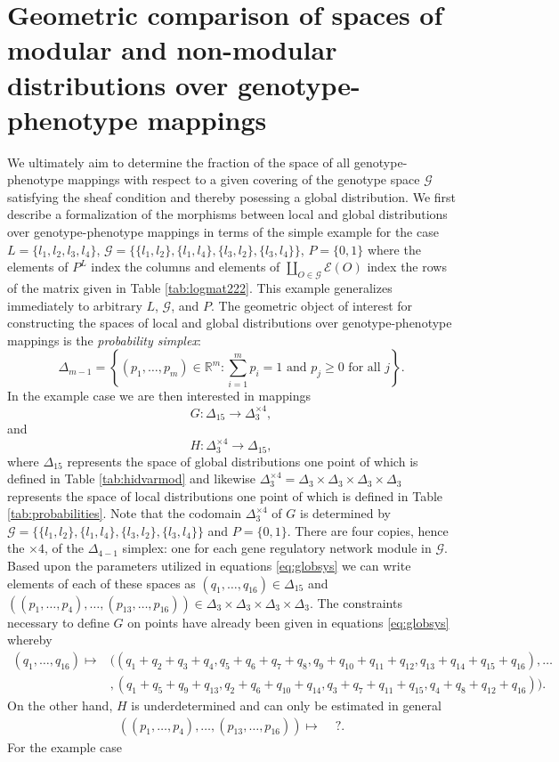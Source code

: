 \section*{Geometric comparison of spaces of modular and non-modular distributions over genotype-phenotype mappings}
We ultimately aim to determine the fraction of the space of all genotype-phenotype mappings with respect to a given covering of the genotype space $\mathcal{G}$ satisfying the sheaf condition and thereby posessing a global distribution. We first describe a formalization of the morphisms between local and global distributions over genotype-phenotype mappings in terms of the simple example for the case $L = \{ l_1,l_2,l_3,l_4 \}$, $\mathcal{G} = \{\{l_1,l_2 \},\{l_1,l_4 \},\{l_3,l_2\},\{l_3,l_4\} \}$, $P=\{0,1\}$ where the elements of $P^L$ index the columns and elements of $\coprod_{O \in \mathcal{G}} \mathcal{E} (O)$ index the rows of the matrix given in Table \ref{tab:logmat222}. This example generalizes immediately to arbitrary $L$, $\mathcal{G}$, and $P$. The geometric object of interest for constructing the spaces of local and global distributions over genotype-phenotype mappings is the \emph{probability simplex}:
$$
\Delta_{m-1} = \left\{ (p_1, \ldots , p_m) \in \mathbb{R}^m \colon \sum_{i=1}^m p_i = 1 \text{ and } p_j \geq 0 \text{ for all } j \right\}.
$$
In the example case we are then interested in mappings
$$
G \colon \Delta_{15} \longrightarrow \Delta_3^{\times 4},
$$
and
$$
H \colon     \Delta_3^{\times 4} \longrightarrow \Delta_{15},
$$
where $\Delta_{15}$ represents the space of global distributions one point of which is defined in Table \ref{tab:hidvarmod} and likewise $\Delta_3^{\times 4} = \Delta_3 \times \Delta_3 \times \Delta_3 \times \Delta_3$ represents the space of local distributions one point of which is defined in Table \ref{tab:probabilities}. Note that the codomain $\Delta_3^{\times 4}$ of $G$ is determined by $\mathcal{G} = \{\{l_1,l_2 \},\{l_1,l_4 \},\{l_3,l_2\},\{l_3,l_4\} \}$ and $P=\{0,1\}$. There are four copies, hence the $\times 4$, of the $\Delta_{4-1}$ simplex: one for each gene regulatory network module in $\mathcal{G}$. Based upon the parameters utilized in equations \ref{eq:globsys} we can write elements of each of these spaces as $(q_1, \ldots, q_{16}) \in \Delta_{15}$ and $((p_1, \ldots , p_4), \ldots, (p_{13},\ldots,p_{16})) \in \Delta_3 \times \Delta_3 \times \Delta_3 \times \Delta_3$. The constraints necessary to define $G$ on points have already been given in equations \ref{eq:globsys} whereby
\begin{align*}
(q_1, \ldots , q_{16}) \mapsto &((q_1+q_2+q_3+q_4, q_5+q_6+q_7+q_8, q_9+q_{10}+q_{11}+q_{12},q_{13}+q_{14}+q_{15}+q_{16}), \ldots \\
&,(q_1 + q_5 + q_9 + q_{13}, q_2 + q_6 + q_{10} + q_{14}, q_3 + q_7 + q_{11} + q_{15}, q_4 + q_8 + q_{12} + q_{16} ) ).
\end{align*}
On the other hand, $H$ is underdetermined and can only be estimated in general
\begin{align*}
((p_1, \ldots , p_4), \ldots, (p_{13},\ldots,p_{16})) \mapsto & \,\,?.
\end{align*}
For the example case
